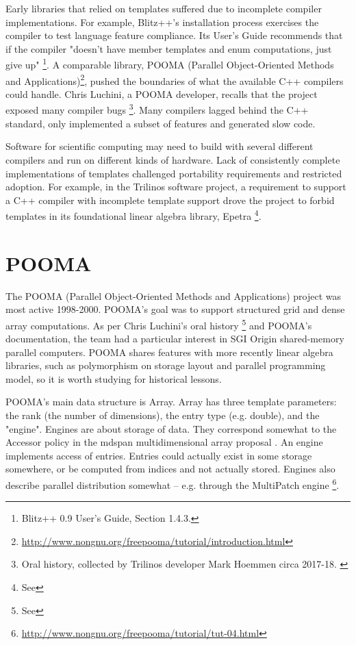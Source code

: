 Early libraries that relied on templates suffered due to incomplete compiler
implementations. For example, Blitz++'s installation process exercises the
compiler to test language feature compliance. Its User's Guide recommends that
if the compiler "doesn't have member templates and enum computations, just give
up" \footnote{Blitz++ 0.9 User’s Guide, Section 1.4.3.}. A comparable library,
POOMA (Parallel Object-Oriented Methods and
Applications)\footnote{\url{http://www.nongnu.org/freepooma/tutorial/introduction.html}},
pushed the boundaries of what the available C++
compilers could handle. Chris Luchini, a POOMA developer, recalls that the
project exposed many compiler bugs \footnote{ Oral history, collected by
  Trilinos developer Mark Hoemmen circa 2017-18. \label{fn:
oral-history-mark-hoemmen}}. Many compilers lagged behind the C++ standard, only
implemented a subset of features and generated slow code\cite{Mateev2000}.

Software for scientific computing may need to build with several different
compilers and run on different kinds of hardware. Lack of consistently complete
implementations of templates challenged portability requirements and restricted
adoption. For example, in the Trilinos software project, a requirement to
support a C++ compiler with incomplete template support  drove the project to
forbid templates in its foundational linear algebra library, Epetra
\footnote{See  }.


\section{POOMA}

The POOMA (Parallel Object-Oriented Methods and Applications) project was most
active 1998-2000. POOMA's goal was to support structured grid and dense array
computations. As per Chris Luchini's oral history \footnote{See  } and POOMA's documentation, the team had a
particular interest in SGI Origin shared-memory parallel computers. POOMA shares
features with more recently linear algebra libraries, such as polymorphism on
storage layout and parallel programming model, so it is worth studying for
historical lessons.

POOMA's main data structure is Array. Array has three template parameters: the
rank (the number of dimensions), the entry type (e.g. double), and the "engine".
Engines are about storage of data. They correspond somewhat to the Accessor
policy in the mdspan multidimensional array proposal \cite{Edwards}. An engine
implements access of entries. Entries could actually exist in some storage
somewhere, or be computed from indices and not actually stored. Engines also
describe parallel distribution somewhat -- e.g. through the MultiPatch engine
\footnote{\url{http://www.nongnu.org/freepooma/tutorial/tut-04.html}}.

